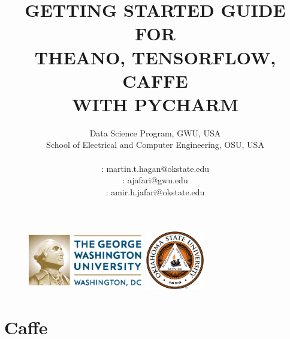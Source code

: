 \documentclass[12pt]{article}
\title{\textbf{GETTING STARTED GUIDE FOR}\\\textbf{THEANO, TENSORFLOW, CAFFE}\\ \textbf{WITH PYCHARM}}%
\author{Data Science Program, GWU, USA \\
School of Electrical and Computer Engineering, OSU, USA\\
\vspace{1cm}\\
\Letter : martin.t.hagan@okstate.edu\\
\Letter : ajafari@gwu.edu\\
\Letter : amir.h.jafari@okstate.edu  }
\begin{document}
\begin{figure}
\centering \includegraphics[width=2in, height=1in]{fig/GW_logo.eps}\hfill
\centering \includegraphics[width=1in, height=1in]{fig/logo1.eps}\hfill
\end{figure}

\maketitle
\newpage
\tableofcontents
\newpage
\listoffigures
\newpage
\section{Caffe}
\end{document}
